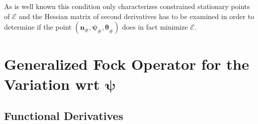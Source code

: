 \documentclass[aps,preprint]{revtex4}%
\begin{document}
As is well known this condition only characterizes constrained stationary
points of $\mathcal{E}$ and the Hessian matrix of second derivatives has to be
examined in order to determine if the point $\left(  \mathbf{n}_{\#}%
\mathbf{,\psi}_{\#}\mathbf{,\theta}_{\#}\right)  $ does in fact minimize
$\mathcal{E}.$

\section{Generalized Fock Operator \label{Fock} for the Variation wrt
$\mathbf{\psi}$}

\subsection{Functional Derivatives}
\end{document}
